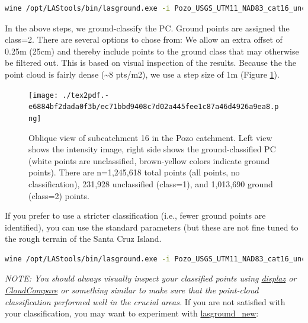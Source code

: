 \documentclass[a4paperpaper,,tablecaptionabove]{scrartcl}
\begin{document}
\begin{lstlisting}[language=bash]
wine /opt/LAStools/bin/lasground.exe -i Pozo_USGS_UTM11_NAD83_cat16_uncln.laz -by_flightline -wilderness -extra_fine -offset 0.25 -stddev 20 -step 1 -spike 0.5 -bulge 0.5 -olaz -o Pozo_USGS_UTM11_NAD83_cat16_clg.laz 
\end{lstlisting}

In the above steps, we ground-classify the PC. Ground points are
assigned the class=2. There are several options to chose from: We allow
an extra offset of 0.25m (25cm) and thereby include points to the ground
class that may otherwise be filtered out. This is based on visual
inspection of the results. Because the the point cloud is fairly dense
(\textasciitilde{}8 pts/m2), we use a step size of 1m (Figure
\ref{Fig:PC_cat16_color_intensity}).

\begin{figure}
\centering
\texttt{[image: ./tex2pdf.-e6884bf2dada0f3b/ec71bbd9408c7d02a445fee1c87a46d4926a9ea8.png]}
\caption{Oblique view of subcatchment 16 in the Pozo catchment. Left
view shows the intensity image, right side shows the ground-classified
PC (white points are unclassified, brown-yellow colors indicate ground
points). There are n=1,245,618 total points (all points, no
classification), 231,928 unclassified (class=1), and 1,013,690 ground
(class=2) points.\label{Fig:PC_cat16_color_intensity}}
\end{figure}

If you prefer to use a stricter classification (i.e., fewer ground
points are identified), you can use the standard parameters (but these
are not fine tuned to the rough terrain of the Santa Cruz Island.

\begin{lstlisting}[language=bash]
wine /opt/LAStools/bin/lasground.exe -i Pozo_USGS_UTM11_NAD83_cat16_uncln.laz -by_flightline -wilderness -extra_fine -olaz -o Pozo_USGS_UTM11_NAD83_cat16_clg_normal.laz 
\end{lstlisting}

\emph{NOTE: You should always visually inspect your classified points
using \href{http://c42f.github.io/displaz/}{displaz} or
\href{https://www.danielgm.net/cc/}{CloudCompare} or something similar
to make sure that the point-cloud classification performed well in the
crucial areas.} If you are not satisfied with your classification, you
may want to experiment with
\href{https://www.cs.unc.edu/~isenburg/lastools/download/lasground_new_README.txt}{lasground\_new}:
\end{document}
